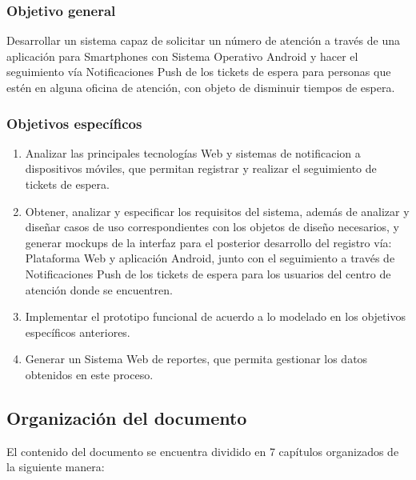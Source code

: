 \subsubsection{Objetivo general}

Desarrollar un sistema capaz de solicitar un número de atención a través de una aplicación para Smartphones con Sistema Operativo Android y hacer el seguimiento vía Notificaciones Push de los tickets de espera para personas que estén en alguna oficina de atención, con objeto de disminuir tiempos de espera.\\
\vspace{-0.4cm}

\subsubsection{Objetivos específicos}

\begin{enumerate}
\item Analizar las principales tecnologías Web y sistemas de notificacion a dispositivos móviles, que permitan registrar y realizar el seguimiento de tickets de espera.
\item Obtener, analizar y especificar los requisitos del sistema, además de analizar y diseñar casos de uso correspondientes con los objetos de diseño necesarios, y generar mockups de la interfaz para el posterior desarrollo del registro vía: Plataforma Web y aplicación Android, junto con el seguimiento a través de Notificaciones Push de los tickets de espera para los usuarios del centro de atención donde se encuentren.
\item Implementar el prototipo funcional de acuerdo a lo modelado en los objetivos específicos anteriores.
\item Generar un Sistema Web de reportes, que permita gestionar los datos obtenidos en este proceso.
\end{enumerate}

\subsection{Organización del documento}

El contenido del documento se encuentra dividido en 7 capítulos organizados de la siguiente manera:

